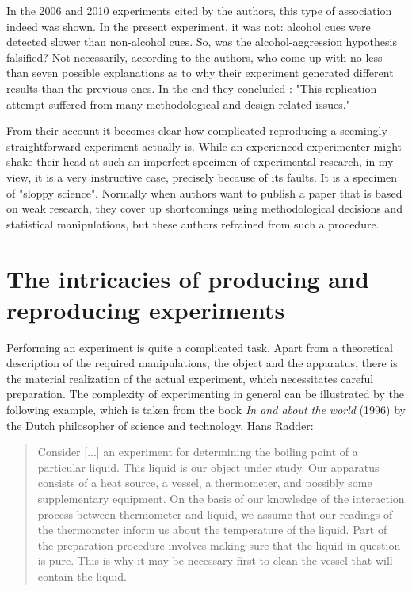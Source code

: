 \documentclass[twocolumn, serif, authordate, reflection]{jote-article}
\begin{document}
In the 2006 and 2010 experiments cited by the authors, this type of association indeed was shown. In the present experiment, it was not: alcohol cues were detected slower than non-alcohol cues. So, was the alcohol-aggression hypothesis falsified? Not necessarily, according to the authors, who come up with no less than seven possible explanations as to why their experiment generated different results than the previous ones. In the end they concluded \parencite[p. 16]{Leboeuf2020}: "This replication attempt suffered from many methodological and design-related issues." 
 
From their account it becomes clear how complicated reproducing a seemingly straightforward experiment actually is. While an experienced experimenter might shake their head at such an imperfect specimen of experimental research, in my view, it is a very instructive case, precisely because of its faults. It is a specimen of "sloppy science". Normally when authors want to publish a paper that is based on weak research, they cover up shortcomings using methodological decisions and statistical manipulations, but these authors refrained from such a procedure.


{}
\section*{The intricacies of producing and reproducing experiments}



Performing an experiment is quite a complicated task. Apart from a theoretical description of the required manipulations, the object and the apparatus, there is the material realization of the actual experiment, which necessitates careful preparation. The complexity of experimenting in general can be illustrated by the following example, which is taken from the book \textit{In and about the world} (1996) by the Dutch philosopher of science and technology, Hans Radder:


\blockquote{Consider [...] an experiment for determining the boiling point of a particular liquid. This liquid is our object under study. Our apparatus consists of a heat source, a vessel, a thermometer, and possibly some supplementary equipment. On the basis of our knowledge of the interaction process between thermometer and liquid, we assume that our readings of the thermometer inform us about the temperature of the liquid. Part of the preparation procedure involves making sure that the liquid in question is pure. This is why it may be necessary first to clean the vessel that will contain the liquid. \parencite[p. 11]{Radder1996}}
\end{document}
